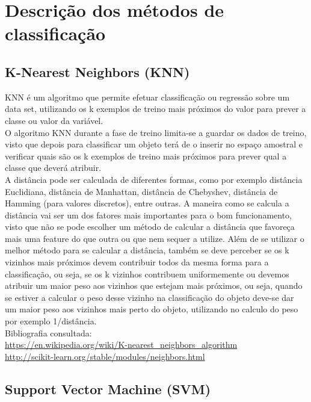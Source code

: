 \documentclass[portugues,final]{revdetua}
\begin{document}
\section{Descrição dos métodos de classificação}

\subsection{K-Nearest Neighbors (KNN)}

KNN é um algoritmo que permite efetuar classificação ou regressão sobre um data set, utilizando os k exemplos de treino mais próximos do valor para prever a classe ou valor da variável.\\

O algoritmo KNN durante a fase de treino limita-se a guardar os dados de treino, visto que depois para classificar um objeto terá de o inserir no espaço amostral e verificar quais são os k exemplos de treino mais próximos para prever qual a classe que deverá atribuir.\\

A distância pode ser calculada de diferentes formas, como por exemplo distância Euclidiana, distância de Manhattan, distância de Chebyshev, distância de Hamming (para valores discretos), entre outras. A maneira como se calcula a distância vai ser um dos fatores mais importantes para o bom funcionamento, visto que não se pode escolher um método de calcular a distância que favoreça mais uma feature do que outra ou que nem sequer a utilize. Além de se utilizar o melhor método para se calcular a distância, também se deve perceber se os k vizinhos mais próximos devem contribuir todos da mesma forma para a classificação, ou seja, se os k vizinhos contribuem uniformemente ou devemos atribuir um maior peso aos vizinhos que estejam mais próximos, ou seja, quando se estiver a calcular o peso desse vizinho na classificação do objeto deve-se dar um maior peso aos vizinhos mais perto do objeto, utilizando no calculo do peso por exemplo 1/distância.\\

Bibliografia consultada:\\
\url{https://en.wikipedia.org/wiki/K-nearest_neighbors_algorithm}\\
\url{http://scikit-learn.org/stable/modules/neighbors.html}

\subsection{Support Vector Machine (SVM)}
\end{document}
